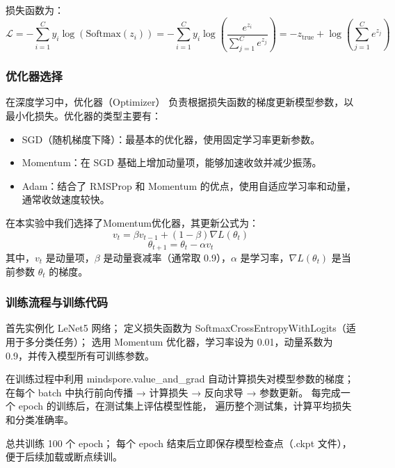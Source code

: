 \documentclass[12pt]{article}
\begin{document}
损失函数为：
$$
\mathcal{L} = -\sum_{i=1}^{C} y_i \log\left( \text{Softmax}(z_i) \right)
= -\sum_{i=1}^{C} y_i \log\left( \frac{e^{z_i}}{\sum_{j=1}^{C} e^{z_j}} \right)= -z_{\text{true}} + \log\left( \sum_{j=1}^{C} e^{z_j} \right)
$$
\subsubsection{优化器选择}
在深度学习中，优化器（Optimizer） 负责根据损失函数的梯度更新模型参数，以最小化损失。优化器的类型主要有：
\begin{itemize}
    \item SGD（随机梯度下降）：最基本的优化器，使用固定学习率更新参数。
    \item Momentum：在 SGD 基础上增加动量项，能够加速收敛并减少振荡。
    \item Adam：结合了 RMSProp 和 Momentum 的优点，使用自适应学习率和动量，通常收敛速度较快。
\end{itemize}
在本实验中我们选择了Momentum优化器，其更新公式为：
$$
v_t = \beta v_{t-1} + (1 - \beta) \nabla L(\theta_t)
$$
$$
\theta_{t+1} = \theta_t - \alpha v_t
$$
其中，$v_t$ 是动量项，$\beta$ 是动量衰减率（通常取 0.9），$\alpha$ 是学习率，$\nabla L(\theta_t)$ 是当前参数 $\theta_t$ 的梯度。
\subsubsection{训练流程与训练代码}
首先实例化 LeNet5 网络；
定义损失函数为 SoftmaxCrossEntropyWithLogits（适用于多分类任务）；
选用 Momentum 优化器，学习率设为 0.01，动量系数为 0.9，并传入模型所有可训练参数。\par

在训练过程中利用 mindspore.value\_and\_grad 自动计算损失对模型参数的梯度；
在每个 batch 中执行前向传播 → 计算损失 → 反向求导 → 参数更新。
每完成一个 epoch 的训练后，在测试集上评估模型性能，
遍历整个测试集，计算平均损失和分类准确率。\par

总共训练 100 个 epoch；
每个 epoch 结束后立即保存模型检查点（.ckpt 文件），便于后续加载或断点续训。\par
\end{document}
